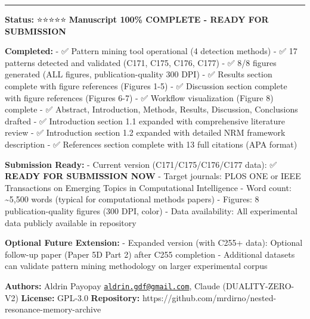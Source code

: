\documentclass[
]{article}
\begin{document}
\begin{center}\rule{0.5\linewidth}{0.5pt}\end{center}

\textbf{Status:} ⭐⭐⭐⭐⭐ \textbf{Manuscript 100\% COMPLETE - READY
FOR SUBMISSION}

\textbf{Completed:} - ✅ Pattern mining tool operational (4 detection
methods) - ✅ 17 patterns detected and validated (C171, C175, C176,
C177) - ✅ 8/8 figures generated (ALL figures, publication-quality 300
DPI) - ✅ Results section complete with figure references (Figures 1-5)
- ✅ Discussion section complete with figure references (Figures 6-7) -
✅ Workflow visualization (Figure 8) complete - ✅ Abstract,
Introduction, Methods, Results, Discussion, Conclusions drafted - ✅
Introduction section 1.1 expanded with comprehensive literature review -
✅ Introduction section 1.2 expanded with detailed NRM framework
description - ✅ References section complete with 13 full citations (APA
format)

\textbf{Submission Ready:} - Current version (C171/C175/C176/C177 data):
✅ \textbf{READY FOR SUBMISSION NOW} - Target journals: PLOS ONE or IEEE
Transactions on Emerging Topics in Computational Intelligence - Word
count: \textasciitilde5,500 words (typical for computational methods
papers) - Figures: 8 publication-quality figures (300 DPI, color) - Data
availability: All experimental data publicly available in repository

\textbf{Optional Future Extension:} - Expanded version (with C255+
data): Optional follow-up paper (Paper 5D Part 2) after C255 completion
- Additional datasets can validate pattern mining methodology on larger
experimental corpus

\textbf{Authors:} Aldrin Payopay
\href{mailto:aldrin.gdf@gmail.com}{\nolinkurl{aldrin.gdf@gmail.com}},
Claude (DUALITY-ZERO-V2) \textbf{License:} GPL-3.0 \textbf{Repository:}
https://github.com/mrdirno/nested-resonance-memory-archive
\end{document}
